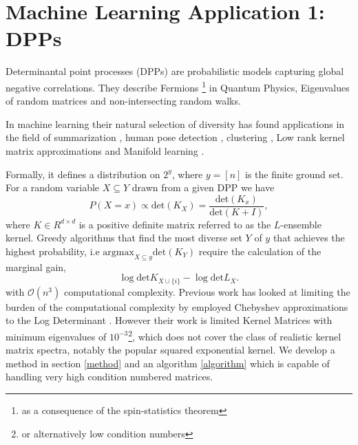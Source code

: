 \documentclass[letterpaper]{article} %
\begin{document}
\section{Machine Learning Application 1: DPPs}
Determinantal point processes (DPPs) \cite{macchi1975coincidence} are probabilistic models capturing global negative correlations. They describe Fermions \footnote{as a consequence of the spin-statistics theorem} in Quantum Physics, Eigenvalues of random matrices and non-intersecting random walks. 

In machine learning their natural selection of diversity has found applications in the field of summarization \cite{gong2014diverse}, human pose detection \cite{kulesza_2012}, clustering \cite{kang2013fast}, Low rank kernel matrix approximations \cite{li2016fast} and Manifold learning \cite{wachinger2015sampling}.

Formally, it defines a distribution on $2^{y}$, where $y = [n]$ is the finite ground set. For a random variable $X \subseteq Y$ drawn from a given DPP we have
\begin{equation}
P(X = x) \propto \mathrm{det}(K_{X}) = \frac{\mathrm{det}(K_{x})}{\mathrm{det}(K+I)},
\end{equation}
where $K \in 
{R}^{d\times d}$ is a positive definite matrix referred to as the $L$-ensemble kernel. Greedy algorithms that find the most diverse set $Y$ of $y$ that achieves the highest probability, i.e $\mathrm{argmax}_{X\subseteq y} \mathrm{det}(K_{Y})$ require the calculation of the marginal gain, 
\begin{equation}
\log \mathrm{det} K_{X\cup\{i\}} - \log \mathrm{det} L_{X}.
\end{equation}
with $\mathcal{O}(n^{3})$ computational complexity. Previous work has looked at limiting the burden of the computational complexity by employed Chebyshev approximations to the Log Determinant \cite{han2017faster}. However their work is limited Kernel Matrices with minimum eigenvalues of $10^{-3}$\footnote{or alternatively low condition numbers}, which does not cover the class of realistic kernel matrix spectra, notably the popular squared exponential kernel. We develop a method in section \ref*{method} and an algorithm \ref{algorithm} which is capable of handling very high condition numbered matrices.





\end{document}
